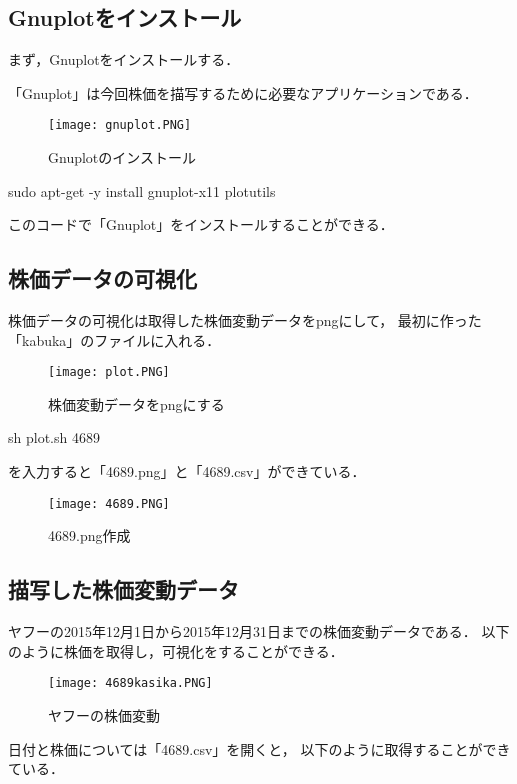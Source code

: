 {\subsection{Gnuplotをインストール}



まず，Gnuplotをインストールする．

「Gnuplot」は今回株価を描写するために必要なアプリケーションである．


\begin{figure}[H]
\centering
\texttt{[image: gnuplot.PNG]}
\caption{Gnuplotのインストール}\label{サンプル図}
\end{figure}


sudo apt-get -y install gnuplot-x11 plotutils

このコードで「Gnuplot」をインストールすることができる．


\subsection{株価データの可視化}
株価データの可視化は取得した株価変動データをpngにして，
最初に作った「kabuka」のファイルに入れる．


\begin{figure}[H]
\centering
\texttt{[image: plot.PNG]}
\caption{株価変動データをpngにする}\label{サンプル図}
\end{figure}

sh plot.sh 4689

を入力すると「4689.png」と「4689.csv」ができている．



\begin{figure}[H]
\centering
\texttt{[image: 4689.PNG]}
\caption{4689.png作成}\label{サンプル図}
\end{figure}

\subsection{描写した株価変動データ}

ヤフーの2015年12月1日から2015年12月31日までの株価変動データである．
以下のように株価を取得し，可視化をすることができる．
\begin{figure}[H]
\centering
\texttt{[image: 4689kasika.PNG]}
\caption{ヤフーの株価変動}\label{サンプル図}
\end{figure}


日付と株価については「4689.csv」を開くと，
以下のように取得することができている．

}
